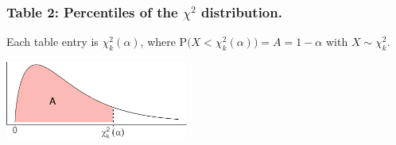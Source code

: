 \documentclass[]{article}
\begin{document}
\hypertarget{table-2-percentiles-of-the-chi2-distribution.}{%
\subsubsection{\texorpdfstring{Table 2: Percentiles of the \(\chi^2\)
distribution.}{Table 2: Percentiles of the \textbackslash{}chi\^{}2 distribution.}}\label{table-2-percentiles-of-the-chi2-distribution.}}

Each table entry is \(\chi^2_k(\alpha)\), where
\(\text{P}\big(X < \chi^2_k(\alpha)\big)=A=1-\alpha\) with
\(X\sim\chi^2_k\). \vspace{0.5em}

\begin{center}\includegraphics[width=6cm]{stat-tables_files/figure-latex/unnamed-chunk-3-1} \end{center}

\vspace{-0.5em}
\end{document}
